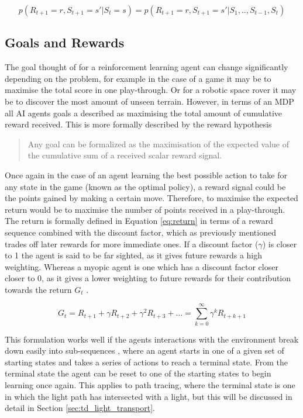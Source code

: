 \documentclass[ %
                    author={Callum Pearce},
                supervisor={Dr. Neill Campbell},
                    degree={MEng},
                     title={How effective are Temporal difference learning methods for reducing the number of zero contribution light paths, while still accurately approximating Global Illumination in Path tracing?},
                  subtitle={},
                      type={research},
                      year={2019} ]{dissertation}
\begin{document}
\begin{equation}
\label{eq:markov_property}
p(R_{t+1} = r, S_{t+1} = s' | S_t = s) = p(R_{t+1} = r, S_{t+1} = s' | S_1, .. , S_{t-1}, S_{t})
\end{equation}

\subsection{Goals and Rewards}
The goal thought of for a reinforcement learning agent can change significantly depending on the problem, for example in the case of a game it may be to maximise the total score in one play-through. Or for a robotic space rover it may be to discover the most amount of unseen terrain. However, in terms of an MDP all AI agents goals a described as maximising the total amount of cumulative reward received. This is more formally described by the reward hypothesis \cite{sutton2011reinforcement}

\begin{quote}
Any goal can be formalized as the maximisation of the expected value of the cumulative sum of a received scalar reward signal.
\end{quote}

Once again in the case of an agent learning the best possible action to take for any state in the game (known as the optimal policy), a reward signal could be the points gained by making a certain move. Therefore, to maximise the expected return would be to maximise the number of points received in a play-through.  The return is formally defined in Equation \ref{eq:return} in terms of a reward sequence combined with the discount factor, which as previously mentioned trades off later rewards for more immediate ones. If a discount factor ($\gamma$) is closer to 1 the agent is said to be far sighted, as it gives future rewards a high weighting. Whereas a myopic agent is one which has a discount factor closer closer to 0, as it gives a lower weighting to future rewards for their contribution towards the return $G_t$ \cite{introToRL}. 

\begin{equation}
\label{eq:return}
G_t = R_{t+1} + \gamma R_{t+2} + \gamma^2 R_{t+3} + ... = \sum^\infty_{k=0} \gamma^k R_{t+k+1}
\end{equation}

This formulation works well if the agents interactions with the environment break down easily into sub-sequences \cite{sutton2011reinforcement}, where an agent starts in one of a given set of starting states and takes a series of actions to reach a terminal state. From the terminal state the agent can be reset to one of the starting states to begin learning once again. This applies to path tracing, where the terminal state is one in which the light path has intersected with a light, but this will be discussed in detail in Section \ref{sec:td_light_transport}.
\end{document}
